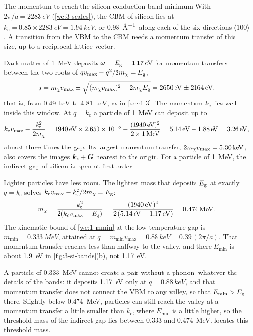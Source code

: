 \begin{workedexample}{The momentum to reach the silicon conduction-band minimum}\label{we:3-kc}
With $2\pi/a = \SI{2283}{eV}$ (\cref{we:3-scales}), the CBM of silicon lies at $k_{\mathrm{c}} = 0.85\times\SI{2283}{eV} = \SI{1.94}{keV}$, or \SI{0.98}{\angstrom^{-1}}, along each of the six directions $\langle100\rangle$. A transition from the VBM to the CBM needs a momentum transfer of this size, up to a reciprocal-lattice vector.

Dark matter of \SI{1}{MeV} deposits $\omega = E_{\mathrm{g}} = \SI{1.17}{eV}$ for momentum transfers between the two roots of $qv_{\mathrm{max}} - q^2/2m_{\chi} = E_{\mathrm{g}}$,
\begin{equation*}
  q = m_{\chi} v_{\mathrm{max}} \pm \sqrt{(m_{\chi} v_{\mathrm{max}})^2 - 2m_{\chi}E_{\mathrm{g}}} = \SI{2650}{eV} \pm \SI{2164}{eV} ,
\end{equation*}
that is, from \SI{0.49}{keV} to \SI{4.81}{keV}, as in \cref{sec:1.3}. The momentum $k_{\mathrm{c}}$ lies well inside this window. At $q = k_{\mathrm{c}}$ a particle of \SI{1}{MeV} can deposit up to
\begin{equation*}
  k_{\mathrm{c}}v_{\mathrm{max}} - \frac{k_{\mathrm{c}}^2}{2m_{\chi}} = \SI{1940}{eV}\times2.650\times10^{-3} - \frac{(\SI{1940}{eV})^2}{2\times\SI{1}{MeV}} = \SI{5.14}{eV} - \SI{1.88}{eV} = \SI{3.26}{eV} ,
\end{equation*}
almost three times the gap. Its largest momentum transfer, $2m_{\chi} v_{\mathrm{max}} = \SI{5.30}{keV}$, also covers the images $\bm{k}_{\mathrm{c}} + \bm{G}$ nearest to the origin. For a particle of \SI{1}{MeV}, the indirect gap of silicon is open at first order.

Lighter particles have less room. The lightest mass that deposits $E_{\mathrm{g}}$ at exactly $q = k_{\mathrm{c}}$ solves $k_{\mathrm{c}}v_{\mathrm{max}} - k_{\mathrm{c}}^2/2m_{\chi} = E_{\mathrm{g}}$:
\begin{equation*}
  m_{\chi} = \frac{k_{\mathrm{c}}^2}{2(k_{\mathrm{c}}v_{\mathrm{max}} - E_{\mathrm{g}})} = \frac{(\SI{1940}{eV})^2}{2\,(\SI{5.14}{eV} - \SI{1.17}{eV})} = \SI{0.474}{MeV} .
\end{equation*}
The kinematic bound of \cref{we:1-mmin} at the low-temperature gap is $m_{\mathrm{min}} = \SI{0.333}{MeV}$, attained at $q = m_{\mathrm{min}}v_{\mathrm{max}} = \SI{0.88}{keV} = 0.39\,(2\pi/a)$. That momentum transfer reaches less than halfway to the valley, and there $E_{\mathrm{min}}$ is about \SI{1.9}{eV} in \cref{fig:3-si-bands}(b), not \SI{1.17}{eV}.

A particle of \SI{0.333}{MeV} cannot create a pair without a phonon, whatever the details of the bands: it deposits \SI{1.17}{eV} only at $q = \SI{0.88}{keV}$, and that momentum transfer does not connect the VBM to any valley, so that $E_{\mathrm{min}} > E_{\mathrm{g}}$ there. Slightly below \SI{0.474}{MeV}, particles can still reach the valley at a momentum transfer a little smaller than $k_{\mathrm{c}}$, where $E_{\mathrm{min}}$ is a little higher, so the threshold mass of the indirect gap lies between 0.333 and \SI{0.474}{MeV}.  locates this threshold mass.
\end{workedexample}

